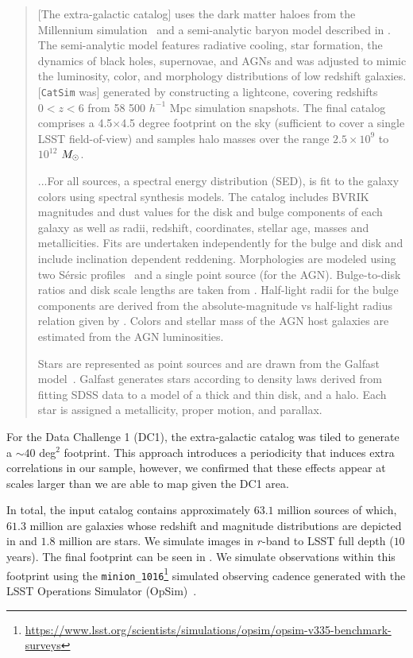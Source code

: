 \documentclass[twocolumn]{aastex62}
\begin{document}
\begin{quote}
[The extra-galactic catalog] uses the dark matter haloes from the Millennium simulation~\citep{2005Nature.435.629S} and a semi-analytic baryon model described in \citet{2006MNRAS.366..499D}. The semi-analytic model features radiative cooling, star formation, the dynamics of black holes, supernovae, and AGNs and was adjusted to mimic the luminosity, color, and morphology distributions of low redshift galaxies.  [\texttt{CatSim} was] generated by constructing a lightcone, covering redshifts $0<z<6$ from 58 500 $h^{-1}$ Mpc simulation snapshots. The final catalog comprises a 4.5$\times$4.5 degree footprint on the sky (sufficient to cover a single LSST field-of-view) and samples halo masses over the range $2.5\times10^{9}$ to $10^{12}$ $M_\odot$.

...For all sources, a spectral energy distribution (SED), is fit to the galaxy colors using \citet{2003MNRAS.344.1000B} spectral synthesis models. The \citet{2006MNRAS.366..499D} catalog includes BVRIK magnitudes and dust values for the disk and bulge components of each galaxy as well as radii, redshift, coordinates, stellar age, masses and metallicities. Fits are undertaken independently for the bulge and disk and include inclination dependent reddening. Morphologies are modeled using two S\'{e}rsic profiles~\citep{1963BAAA....6...41S} and a single point source (for the AGN). Bulge-to-disk ratios and disk scale lengths are taken from \citep{2006MNRAS.366..499D}. Half-light radii for the bulge components are derived from the absolute-magnitude vs half-light radius relation given by \citet{2011A&A...534A...3G}. Colors and stellar mass of the AGN host galaxies are estimated from the AGN luminosities.

Stars are represented as point sources and are drawn from the Galfast model~\citep{2008ApJ...673..864J}. Galfast generates stars according to density laws derived from fitting SDSS data to a model of a thick and thin disk, and a halo. Each star is assigned a metallicity, proper motion, and parallax.
\end{quote}

For the Data Challenge 1 (DC1), the extra-galactic catalog was tiled to generate a $\sim 40$ deg$^{2}$ footprint. This approach introduces a periodicity that induces extra correlations in our sample, however, we confirmed that these effects appear at scales larger than we are able to map given the DC1 area.

In total, the input catalog contains approximately $63.1$ million sources of which, $61.3$ million are galaxies whose redshift and magnitude distributions are depicted in  and $1.8$ million are stars. We simulate images in $r$-band to LSST full depth ($10$ years). The final footprint can be seen in .  We simulate observations within this footprint using the \texttt{minion\_1016}\footnote{\url{https://www.lsst.org/scientists/simulations/opsim/opsim-v335-benchmark-surveys}} simulated observing cadence generated with the LSST Operations Simulator (OpSim)~\citep{2014SPIE.9150E..15D}.
\end{document}
